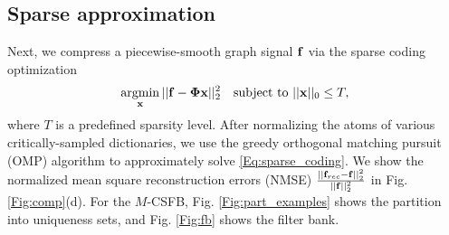 \documentclass[journal, 10pt]{IEEEtran}
\begin{document}
\subsection{Sparse approximation}
Next, we compress 
a piecewise-smooth graph signal ${\bf f}$ via the sparse coding optimization
\begin{align}\label{Eq:sparse_coding}
\argmin_{\bf x}   || {\bf f}-\boldsymbol{\Phi}{\bf x} ||_2^2 \hbox{~~~subject to } ||{\bf x}||_0 \leq T,
\end{align}
where $T$ is a predefined sparsity level. After %
normalizing the atoms of various critically-sampled dictionaries, we use the greedy %
 orthogonal matching pursuit (OMP) algorithm \cite{tropp2004greed,elad_book} to approximately solve \eqref{Eq:sparse_coding}. 
  We show the normalized mean square reconstruction errors (NMSE) $\frac{\left|\left|{\bf f}_{{rec}}-{\bf f}\right|\right|_2^2}{||{\bf f}||_2^2}$ in Fig. \ref{Fig:comp}(d). 
 For the $M$-CSFB, %
 Fig. \ref{Fig:part_examples} shows 
 the partition into uniqueness sets, and  
 Fig. \ref{Fig:fb} shows the filter bank.
\end{document}
